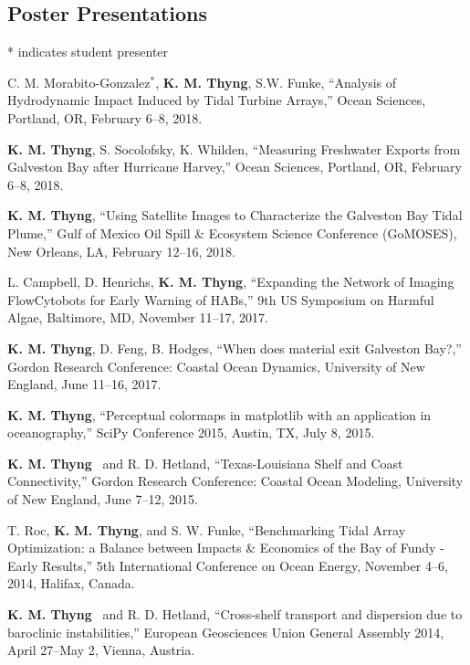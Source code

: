 \documentclass[10pt,letterpaper]{article}
\newcommand{\kmt}{\textbf{K. M. Thyng}}
\renewenvironment{itemize}{
  \begin{list}{}{
    \setlength{\leftmargin}{1.5em}
    \setlength{\itemsep}{0.25em}
    \setlength{\parskip}{0pt}
    \setlength{\parsep}{0.25em}
  }
}{
  \end{list}
}
\begin{document}
\subsection*{Poster Presentations}
* indicates student presenter
\begin{itemize}

\item C. M. Morabito-Gonzalez$^*$, \kmt, S.W. Funke, ``Analysis of Hydrodynamic Impact Induced by Tidal Turbine Arrays,'' Ocean Sciences, Portland, OR, February 6--8, 2018.

\item \kmt, S. Socolofsky, K. Whilden, ``Measuring Freshwater Exports from Galveston Bay after Hurricane Harvey,'' Ocean Sciences, Portland, OR, February 6--8, 2018.

\item \kmt, ``Using Satellite Images to Characterize the Galveston Bay Tidal Plume,'' Gulf of Mexico Oil Spill \& Ecosystem Science Conference (GoMOSES), New Orleans, LA, February 12--16, 2018.

\item L. Campbell, D. Henrichs, \kmt, ``Expanding the Network of Imaging FlowCytobots for Early Warning of HABs,'' 9th US Symposium on Harmful Algae, Baltimore, MD, November 11--17, 2017.

\item \kmt, D. Feng, B. Hodges, ``When does material exit Galveston Bay?,'' Gordon Research Conference: Coastal Ocean Dynamics, University of New England, June 11--16, 2017.

\item \kmt, ``Perceptual colormaps in matplotlib with an application in oceanography,'' SciPy Conference 2015, Austin, TX, July 8, 2015.

\item \kmt~ and R. D. Hetland, ``Texas-Louisiana Shelf and Coast Connectivity,'' Gordon Research Conference: Coastal Ocean Modeling, University of New England, June 7--12, 2015.

\item T. Roc, \kmt, and S. W. Funke, ``Benchmarking Tidal Array Optimization: a Balance between Impacts \& Economics of the Bay of Fundy - Early Results,'' 5th International Conference on Ocean Energy, November 4--6, 2014, Halifax, Canada.

\item \kmt~ and R. D. Hetland, ``Cross-shelf transport and dispersion due to baroclinic instabilities,'' European Geosciences Union General Assembly 2014, April 27--May 2, Vienna, Austria.


\end{itemize}
\end{document}
